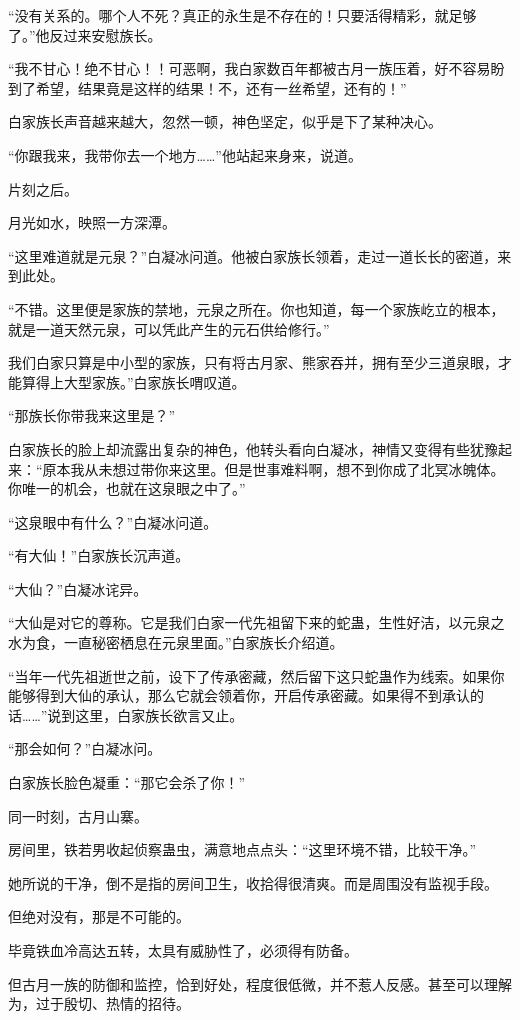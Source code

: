 \begin{this_body}
“没有关系的。哪个人不死？真正的永生是不存在的！只要活得精彩，就足够了。”他反过来安慰族长。

“我不甘心！绝不甘心！！可恶啊，我白家数百年都被古月一族压着，好不容易盼到了希望，结果竟是这样的结果！不，还有一丝希望，还有的！”

白家族长声音越来越大，忽然一顿，神色坚定，似乎是下了某种决心。

“你跟我来，我带你去一个地方……”他站起来身来，说道。

片刻之后。

月光如水，映照一方深潭。

“这里难道就是元泉？”白凝冰问道。他被白家族长领着，走过一道长长的密道，来到此处。

“不错。这里便是家族的禁地，元泉之所在。你也知道，每一个家族屹立的根本，就是一道天然元泉，可以凭此产生的元石供给修行。”

我们白家只算是中小型的家族，只有将古月家、熊家吞并，拥有至少三道泉眼，才能算得上大型家族。”白家族长喟叹道。

“那族长你带我来这里是？”

白家族长的脸上却流露出复杂的神色，他转头看向白凝冰，神情又变得有些犹豫起来：“原本我从未想过带你来这里。但是世事难料啊，想不到你成了北冥冰魄体。你唯一的机会，也就在这泉眼之中了。”

“这泉眼中有什么？”白凝冰问道。

“有大仙！”白家族长沉声道。

“大仙？”白凝冰诧异。

“大仙是对它的尊称。它是我们白家一代先祖留下来的蛇蛊，生性好洁，以元泉之水为食，一直秘密栖息在元泉里面。”白家族长介绍道。

“当年一代先祖逝世之前，设下了传承密藏，然后留下这只蛇蛊作为线索。如果你能够得到大仙的承认，那么它就会领着你，开启传承密藏。如果得不到承认的话……”说到这里，白家族长欲言又止。

“那会如何？”白凝冰问。

白家族长脸色凝重：“那它会杀了你！”

同一时刻，古月山寨。

房间里，铁若男收起侦察蛊虫，满意地点点头：“这里环境不错，比较干净。”

她所说的干净，倒不是指的房间卫生，收拾得很清爽。而是周围没有监视手段。

但绝对没有，那是不可能的。

毕竟铁血冷高达五转，太具有威胁性了，必须得有防备。

但古月一族的防御和监控，恰到好处，程度很低微，并不惹人反感。甚至可以理解为，过于殷切、热情的招待。


\end{this_body}
